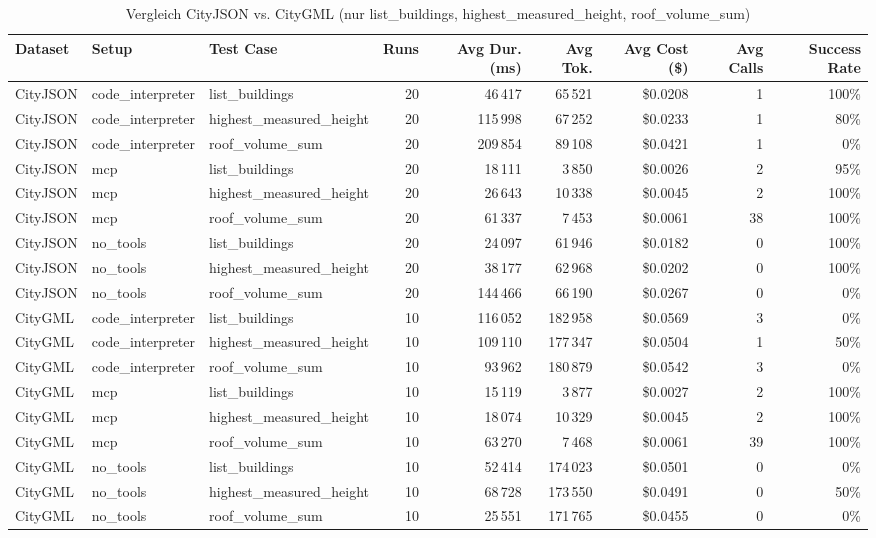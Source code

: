 \begin{table}[H]
\centering
\scriptsize
\caption{Vergleich CityJSON vs. CityGML (nur list\_buildings, highest\_measured\_height, roof\_volume\_sum)}
\begin{tabular}{l l l r r r r r r}
\toprule
Dataset & Setup & Test Case & Runs & Avg Dur. (ms) & Avg Tok. & Avg Cost (\$) & Avg Calls & Success Rate \\
\midrule
CityJSON & code\_interpreter & list\_buildings & 20 & 46\,417 & 65\,521 & \$0.0208 & 1 & 100\% \\
CityJSON & code\_interpreter & highest\_measured\_height & 20 & 115\,998 & 67\,252 & \$0.0233 & 1 & 80\% \\
CityJSON & code\_interpreter & roof\_volume\_sum & 20 & 209\,854 & 89\,108 & \$0.0421 & 1 & 0\% \\
\midrule
CityJSON & mcp & list\_buildings & 20 & 18\,111 & 3\,850 & \$0.0026 & 2 & 95\% \\
CityJSON & mcp & highest\_measured\_height & 20 & 26\,643 & 10\,338 & \$0.0045 & 2 & 100\% \\
CityJSON & mcp & roof\_volume\_sum & 20 & 61\,337 & 7\,453 & \$0.0061 & 38 & 100\% \\
\midrule
CityJSON & no\_tools & list\_buildings & 20 & 24\,097 & 61\,946 & \$0.0182 & 0 & 100\% \\
CityJSON & no\_tools & highest\_measured\_height & 20 & 38\,177 & 62\,968 & \$0.0202 & 0 & 100\% \\
CityJSON & no\_tools & roof\_volume\_sum & 20 & 144\,466 & 66\,190 & \$0.0267 & 0 & 0\% \\
\midrule
CityGML & code\_interpreter & list\_buildings & 10 & 116\,052 & 182\,958 & \$0.0569 & 3 & 0\% \\
CityGML & code\_interpreter & highest\_measured\_height & 10 & 109\,110 & 177\,347 & \$0.0504 & 1 & 50\% \\
CityGML & code\_interpreter & roof\_volume\_sum & 10 & 93\,962 & 180\,879 & \$0.0542 & 3 & 0\% \\
\midrule
CityGML & mcp & list\_buildings & 10 & 15\,119 & 3\,877 & \$0.0027 & 2 & 100\% \\
CityGML & mcp & highest\_measured\_height & 10 & 18\,074 & 10\,329 & \$0.0045 & 2 & 100\% \\
CityGML & mcp & roof\_volume\_sum & 10 & 63\,270 & 7\,468 & \$0.0061 & 39 & 100\% \\
\midrule
CityGML & no\_tools & list\_buildings & 10 & 52\,414 & 174\,023 & \$0.0501 & 0 & 0\% \\
CityGML & no\_tools & highest\_measured\_height & 10 & 68\,728 & 173\,550 & \$0.0491 & 0 & 50\% \\
CityGML & no\_tools & roof\_volume\_sum & 10 & 25\,551 & 171\,765 & \$0.0455 & 0 & 0\% \\
\bottomrule
\end{tabular}
\end{table}
